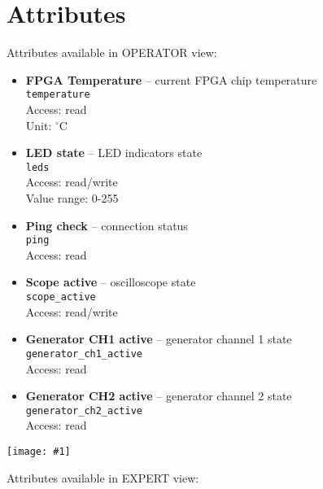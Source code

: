\documentclass[12pt,a4paper]{article}
\newcommand{\screenshot}[1]{\begin{minipage}[c]{\textwidth}\texttt{[image: \#1]}\end{minipage}}
\begin{document}
	\section{Attributes}
	Attributes available in OPERATOR view:
	\begin{itemize}
		\item \textbf{FPGA Temperature} -- current FPGA chip temperature\\
			  \texttt{temperature}\\
			  Access: read\\
			  Unit: $^{\circ}$C
		\item \textbf{LED state} -- LED indicators state\\
			  \texttt{leds}\\
			  Access: read/write\\
			  Value range: 0-255
		\item \textbf{Ping check} -- connection status\\
			  \texttt{ping}\\
			  Access: read
		\item \textbf{Scope active} -- oscilloscope state\\
			  \texttt{scope\_active}\\
			  Access: read/write
		\item \textbf{Generator CH1 active} -- generator channel 1 state\\
			  \texttt{generator\_ch1\_active}\\
			  Access: read
		\item \textbf{Generator CH2 active} -- generator channel 2 state\\
			  \texttt{generator\_ch2\_active}\\
			  Access: read
	\end{itemize}
	\screenshot{screenshots/operator.png}
	Attributes available in EXPERT view:
\end{document}
